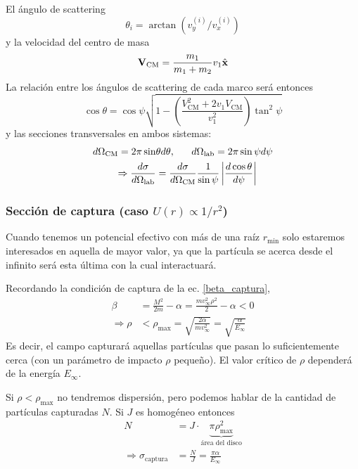 \documentclass[]{article}
\numberwithin{equation}{section}
\begin{document}
El ángulo de scattering
\begin{equation*}
	\theta_i = \arctan\left(v_y^{(i)} / v_x^{(i)}\right)
\end{equation*}
y la velocidad del centro de masa
\begin{equation*}
	\mathbf{V}_{\mathrm{CM}} = \frac{m_1}{m_1 + m_2}v_1 \hat{\mathbf{x}}
\end{equation*}
La relación entre los ángulos de scattering de cada marco será entonces
\begin{equation}
	\cos\theta = \cos\psi\sqrt{1 - \left(\frac{V^2_\mathrm{CM} + 2 v_1 V_\mathrm{CM}}{v_1^2}\right)\tan^2\psi}
\end{equation}
y las secciones transversales en ambos sistemas:
\begin{align}
	d\Omega_\mathrm{CM} = 2\pi \sin&\theta d\theta, ~~~~~ d\Omega_\mathrm{lab} = 2\pi \sin\psi d\psi\\
	\Rightarrow \dfrac{d \sigma}{d \Omega_\mathrm{lab}} &= \dfrac{d \sigma}{d \Omega_\mathrm{CM}} \frac{1}{\sin\psi} \left|\dfrac{d \cos\theta}{d \psi}\right|
\end{align}

\subsubsection{Sección de captura (caso \(U(r) \propto 1/r^2\))}
Cuando tenemos un potencial efectivo con más de una raíz \(r_\mathrm{min}\) solo estaremos interesados en aquella de mayor valor, ya que la partícula se acerca desde el infinito será esta última con la cual interactuará.

Recordando la condición de captura de la ec. \ref{beta_captura},
\begin{align}
	\beta &= \frac{M^2}{2 m} - \alpha = \frac{m v_\infty^2 \rho^2}{2} - \alpha < 0\nonumber\\
	\Rightarrow \rho &< \rho_\mathrm{max} = \sqrt{\frac{2 \alpha}{m v_\infty^2}} = \sqrt{\frac{\alpha}{E_\infty}}
\end{align}
Es decir, el campo capturará aquellas partículas que pasan lo suficientemente cerca (con un parámetro de impacto \(\rho\) pequeño). El valor crítico de \(\rho\) dependerá de la energía \(E_\infty\).

Si \(\rho < \rho_\mathrm{max}\) no tendremos dispersión, pero podemos hablar de la cantidad de partículas capturadas \(N\). Si \(J\) es homogéneo entonces
\begin{align}
	N &= J\cdot\underbrace{\pi \rho_\mathrm{max}^2}_{\text{área del disco}}\nonumber\\
	\Rightarrow \sigma_{\text{captura}} &= \frac{N}{J} = \frac{\pi\alpha}{E_\infty}
\end{align}
\end{document}
